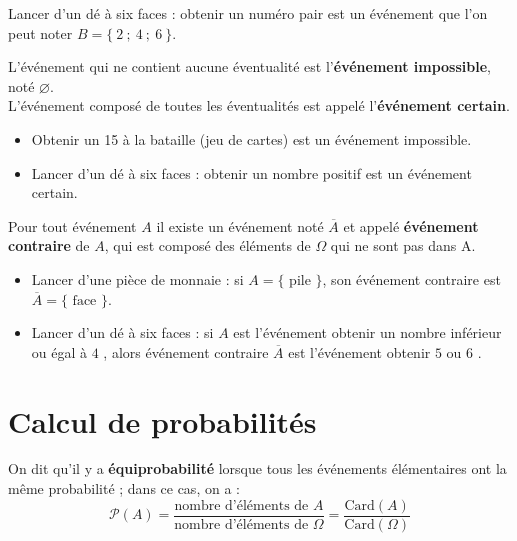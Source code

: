 \begin{exemple*1}
   Lancer d'un dé à six faces : \og obtenir un numéro pair \fg{} est un événement que l'on peut noter $B=\{~2~;~4~;~6~\}$.
\end{exemple*1}

\begin{definition}
   L'événement qui ne contient aucune éventualité est l'\textbf{événement impossible}, noté $\varnothing$. \\
   L'événement composé de toutes les éventualités est appelé l'\textbf{événement certain}.
\end{definition}

\begin{exemple*1}
      \begin{itemize}
      \item \og Obtenir un 15 \fg{} à la bataille (jeu de cartes) est un événement impossible.
      \item Lancer d'un dé à six faces : \og obtenir un nombre positif \fg{} est un événement certain.
   \end{itemize}
\end{exemple*1}

\begin{definition}
   Pour tout événement $A$ il existe un événement noté $\overline{A}$ et appelé \textbf{événement contraire} de $A$, qui est composé des éléments de $\Omega$ qui ne sont pas dans A.
\end{definition}

\begin{exemple*1}
   \begin{itemize}
      \item Lancer d'une pièce de monnaie : si $A=\{\text{~pile~}\}$, son événement contraire est $\overline{A}=\{\text{~face~}\}$.
      \item Lancer d'un dé à six faces : si $A$ est l'événement \og obtenir un nombre inférieur ou égal à $4$ \fg{}, alors événement contraire $\overline{A}$ est l'événement \og obtenir $5$ ou $6$ \fg{}.
   \end{itemize}
\end{exemple*1}


\section{Calcul de probabilités} 

\begin{definition}[Équiprobabilité]
   On dit qu'il y a \textbf{équiprobabilité} lorsque tous les événements élémentaires ont la même probabilité ; dans ce cas, on a :
   $$\mathcal{P}(A) =\dfrac{\textrm{nombre d'éléments de }A}{\textrm{nombre d'éléments de }\Omega} =\dfrac{\textrm{Card}(A)}{\textrm{Card}(\Omega)}$$
\end{definition}

